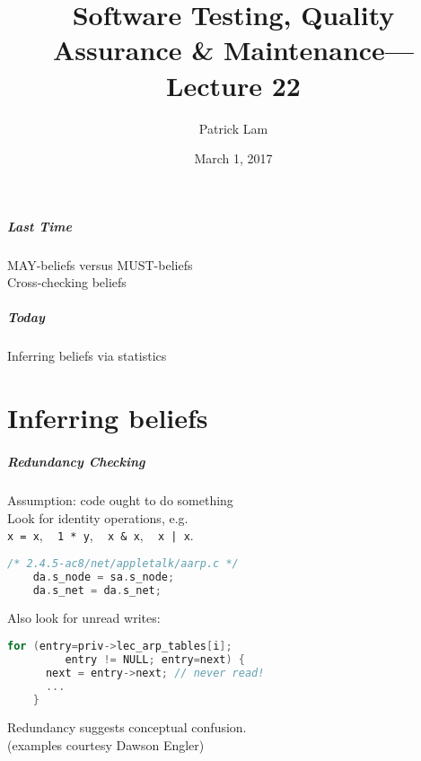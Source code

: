 \documentclass{beamer}
\title{Software Testing, Quality Assurance \& Maintenance---Lecture 22}
\author{Patrick Lam}
\date{March 1, 2017}
\newenvironment{changemargin}[1]{%
  \begin{list}{}{%
    \setlength{\topsep}{0pt}%
    \setlength{\leftmargin}{#1}%
    \setlength{\rightmargin}{1em}
    \setlength{\listparindent}{\parindent}%
    \setlength{\itemindent}{\parindent}%
    \setlength{\parsep}{\parskip}%
  }%
  \item[]}{\end{list}}
\begin{document}
\begin{frame}
  \titlepage
\end{frame}

\begin{frame}
  \frametitle{Last Time}

  \begin{changemargin}{2cm}
    MAY-beliefs versus MUST-beliefs\\[1em]
    Cross-checking beliefs
  \end{changemargin}
\end{frame}

\begin{frame}
\frametitle{Today}
\begin{changemargin}{2cm}
Inferring beliefs via statistics\\
\end{changemargin}
\end{frame}

\part{Inferring beliefs}
\frame{\partpage}

\begin{frame}[fragile]
\frametitle{Redundancy Checking}
  \begin{changemargin}{2cm}
    Assumption: code ought to do something\\[1em]
    Look for identity operations, e.g.\\
\hspace*{4em} {\tt x = x}, ~ {\tt 1 * y}, ~ {\tt x \& x}, ~ {\tt x | x}.\\
  \end{changemargin}
{\small
\begin{lstlisting}[language=C]
    /* 2.4.5-ac8/net/appletalk/aarp.c */
    da.s_node = sa.s_node;
    da.s_net = da.s_net;
\end{lstlisting}
}
  \begin{changemargin}{2cm}
    Also look for unread writes:\\
  \end{changemargin}

{\small \begin{lstlisting}[language=C]
    for (entry=priv->lec_arp_tables[i]; 
         entry != NULL; entry=next) {
      next = entry->next; // never read!
      ...
    }
\end{lstlisting} 
}
  \begin{changemargin}{2cm}
Redundancy suggests conceptual confusion.\\
\small \hfill (examples courtesy Dawson Engler)
 
  \end{changemargin}

\end{frame}
\end{document}

